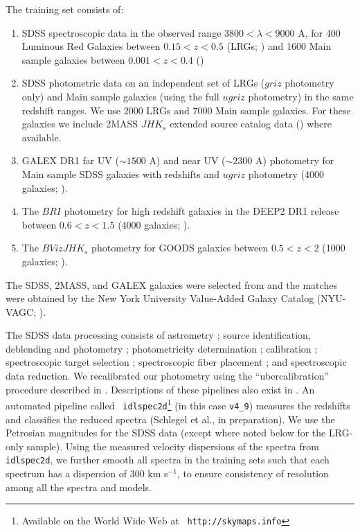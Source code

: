 \documentclass[10pt,preprint]{aastex}
\renewcommand{\AA}{A}
\begin{document}
The training set consists of:
\begin{enumerate}
\item SDSS spectroscopic data in the observed range $3800 < \lambda <
9000$ \AA, for 400 Luminous Red Galaxies between $0.15 < z < 0.5$ (LRGs;
\citealt{eisenstein01a}) and 1600 Main sample galaxies between $0.001
< z < 0.4$ (\citealt{strauss02a})
\item SDSS photometric data on an independent set of LRGs ($griz$
photometry only) and Main sample galaxies (using the full $ugriz$
photometry) in the same redshift ranges. We use 2000 LRGs and 7000
Main sample galaxies.  For these galaxies we include 2MASS $JHK_s$
extended source catalog data (\citealt{jarrett00a}) where available.
\item GALEX DR1 far UV ($\sim 1500$ \AA) and near UV ($\sim 2300$ \AA)
photometry for Main sample SDSS galaxies with redshifts and $ugriz$
photometry (4000 galaxies; \citealt{martin05a}).
\item The $BRI$ photometry for high redshift galaxies in the DEEP2 
DR1 release between $0.6 < z < 1.5$ (4000
galaxies; \citealt{davis03a, faber03a}).
\item The $BVizJHK_s$ photometry for GOODS galaxies between $0.5 < z < 2$ (1000
galaxies; \citealt{giavalisco04a}).
\end{enumerate}
The SDSS, 2MASS, and GALEX galaxies were selected from and the matches
were obtained by the New York University Value-Added Galaxy Catalog
(NYU-VAGC;
\citealt{blanton05a}).  

The SDSS data processing consists of astrometry \citep{pier03a};
source identification, deblending and photometry \citep{lupton01a};
photometricity determination \citep{hogg01a}; calibration
\citep{fukugita96a,smith02a}; spectroscopic target selection
\citep{eisenstein01a,strauss02a,richards02a}; spectroscopic fiber
placement \citep{blanton03a}; and spectroscopic data reduction.  We
recalibrated our photometry using the ``ubercalibration'' procedure
described in \citet{blanton05a}.  Descriptions of these pipelines also
exist in \citet{stoughton02a}.  An automated pipeline called {\tt
idlspec2d}\footnote{Available on the World Wide Web at {\tt
http://skymaps.info}} (in this case {\tt v4\_9}) measures the
redshifts and classifies the reduced spectra (Schlegel et al., in
preparation). We use the Petrosian magnitudes for the SDSS data
(except where noted below for the LRG-only sample). Using the measured
velocity dispersions of the spectra from {\tt idlspec2d}, we further
smooth all spectra in the training sets such that each spectrum has a
dispersion of 300 km s$^{-1}$, to ensure consistency of resolution
among all the spectra and models.
\end{document}
